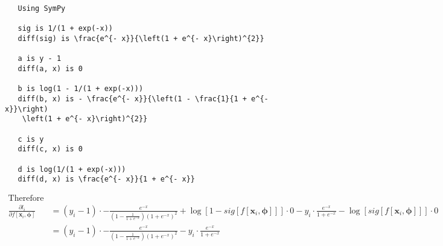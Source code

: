 \documentclass{article}
\begin{document}
\begin{verbatim}
   Using SymPy

   sig is 1/(1 + exp(-x))
   diff(sig) is \frac{e^{- x}}{\left(1 + e^{- x}\right)^{2}}

   a is y - 1
   diff(a, x) is 0

   b is log(1 - 1/(1 + exp(-x)))
   diff(b, x) is - \frac{e^{- x}}{\left(1 - \frac{1}{1 + e^{- x}}\right)
    \left(1 + e^{- x}\right)^{2}}

   c is y
   diff(c, x) is 0

   d is log(1/(1 + exp(-x)))
   diff(d, x) is \frac{e^{- x}}{1 + e^{- x}}
\end{verbatim}


\begin{align*}
   \text{Therefore} \\
   \frac{\partial{l_{i}}}{\partial{f[\boldsymbol{x}_{i}, \boldsymbol{\phi}]}} &=
   (y_{i} - 1) \cdot
   - \frac{e^{- x}}{\left(1 - \frac{1}{1 + e^{- x}}\right) \left(1 + e^{- x}\right)^{2}}
   + \log [ 1 - sig[f[\boldsymbol{x}_{i}, \boldsymbol{\phi}]]] \cdot 0
   - y_{i} \cdot \frac{e^{- x}}{1 + e^{- x}}
   - \log [ sig[f[\boldsymbol{x}_{i}, \boldsymbol{\phi}]]] \cdot 0 \\
   &= (y_{i} - 1) \cdot
   - \frac{e^{- x}}{\left(1 - \frac{1}{1 + e^{- x}}\right) \left(1 + e^{- x}\right)^{2}}
   - y_{i} \cdot \frac{e^{- x}}{1 + e^{- x}}
\end{align*}
\end{document}
